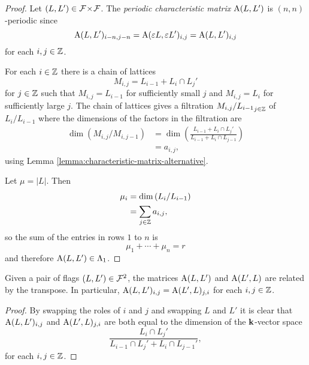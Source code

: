 \documentclass[a4paper, 11pt]{report}
\begin{document}
\begin{proof}
Let $(L,L')\in{\mathcal{F}\!\times\!\mathcal{F}}$. The \emph{periodic characteristic matrix} $\operatorname{A}(L,L')$ is $(n,n)$-periodic since
\begin{equation*}
\operatorname{A}(L,L')_{i-n,j-n} = \operatorname{A}(\varepsilon L,\varepsilon L')_{i,j} = \operatorname{A}(L,L')_{i,j}
\end{equation*}
for each $i,j\in\mathbb{Z}$.

For each $i\in\mathbb{Z}$ there is a chain of lattices
\begin{equation*}
M_{i,j} = L_{i-1} + L_i\cap L_j'
\end{equation*}
for $j\in\mathbb{Z}$ such that $M_{i,j}=L_{i-1}$ for sufficiently small $j$ and $M_{i,j}=L_i$ for sufficiently large $j$. The chain of lattices gives a filtration $M_{i,j}/{L_{i-1}}_{j\in\mathbb{Z}}$ of $L_i/{L_{i-1}}$ where the dimensions of the factors in the filtration are
\begin{align*}
\dim\left(M_{i,j}/{M_{i,j-1}}\right)
&= \dim\left(\frac{L_{i-1} + L_i\cap L_j'}{L_{i-1} + L_i\cap L_{j-1}}\right)\\
&= a_{i,j},
\end{align*}
using Lemma \ref{lemma:characteristic-matrix-alternative}.

Let $\mu=|L|$. Then
\begin{align*}
\mu_i
&= \dim\left(L_i/{L_{i-1}}\right)\\
&= \sum_{j\in\mathbb{Z}} a_{i,j},
\end{align*}
so the sum of the entries in rows $1$ to $n$ is
\begin{equation*}
\mu_1+\cdots +\mu_n = r
\end{equation*}
and therefore $\operatorname{A}(L,L')\in\Lambda_1{}$.
\end{proof}

\begin{lemma}\label{lemma:transpose-orbit}
Given a pair of flags $(L,L')\in\mathcal{F}^2$, the matrices $\operatorname{A}(L,L')$ and $\operatorname{A}(L',L)$ are related by the transpose. In particular, $\operatorname{A}(L,L')_{i,j} = \operatorname{A}(L',L)_{j,i}$ for each $i,j\in\mathbb{Z}$.
\end{lemma}

\begin{proof}
By swapping the roles of $i$ and $j$ and swapping $L$ and $L'$ it is clear that $\operatorname{A}(L,L')_{i,j}$ and $\operatorname{A}(L',L)_{j,i}$ are both equal to the dimension of the $\mathbf{k}$-vector space
\begin{equation*}
\frac{L_i\cap L_j'}{L_{i-1}\cap L_j' + L_i\cap L_{j-1}'},
\end{equation*}
for each $i,j\in\mathbb{Z}$.
\end{proof}
\end{document}
